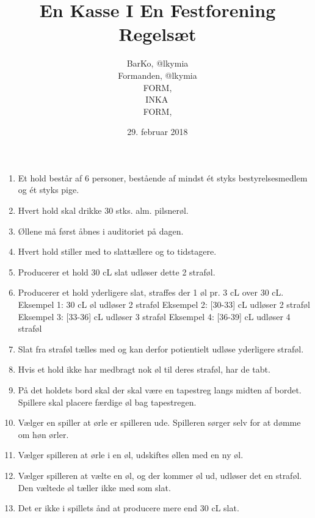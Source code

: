 \documentclass[a4paper, 12pt]{article}
\title{
    En Kasse I En Festforening\\
    Regelsæt
}
\author{
    BarKo, @lkymia\\
    Formanden, @lkymia\\
    \TKprefix{16}FORM, \TKET\\
    \TKprefix{17}INKA\, \TKET\\
    \TKprefix{13}FORM, \TKET\\
}
\date{29. februar 2018}
\begin{document}
\maketitle
\begin{enumerate}
 \item Et hold består af 6 personer, bestående af mindst ét styks bestyrelsesmedlem og ét styks pige.
 \item Hvert hold skal drikke 30 stks. alm. pilsnerøl.
 \item Øllene må først åbnes i auditoriet på dagen.
 \item Hvert hold stiller med to slattællere og to tidstagere.
 \item Producerer et hold 30 cL slat udløser dette 2 straføl.
 \item Producerer et hold yderligere slat, straffes der 1 øl pr. 3 cL over 30 cL.
	 \subitem Eksempel 1: 30 cL øl udløser 2 straføl
	 \subitem Eksempel 2: [30-33] cL udløser 2 straføl
	 \subitem Eksempel 3: [33-36] cL udløser 3 straføl
	 \subitem Eksempel 4: [36-39] cL udløser 4 straføl
 \item Slat fra straføl tælles med og kan derfor potientielt udløse yderligere straføl.
 \item Hvis et hold ikke har medbragt nok øl til deres straføl, har de tabt.
 \item På det holdets bord skal der skal være en tapestreg langs midten af bordet. Spillere skal placere færdige øl bag tapestregen.
 \item Vælger en spiller at ørle er spilleren ude. Spilleren sørger selv for at dømme om høn ørler.
 \item Vælger spilleren at ørle i en øl, udskiftes øllen med en ny øl.
 \item Vælger spilleren at vælte en øl, og der kommer øl ud, udløser det en straføl. Den væltede øl tæller ikke med som slat.
 \item Det er ikke i spillets ånd at producere mere end 30 cL slat.
\end{enumerate}
\end{document}
